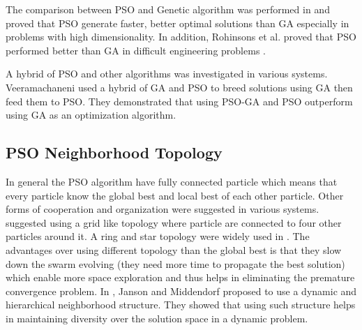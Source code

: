  The comparison between PSO and Genetic algorithm was performed in \cite{PSOGAComp,ComparePSOGA05,CoPSAanGA05,PAOvsGA07} and proved that PSO generate faster, better optimal solutions than GA especially in problems with high dimensionality. In addition, Rohinsons et al. \cite{RohinsonPSGA} proved that PSO performed better than GA in difficult engineering problems \cite{EngineerProblemGA}. 
 
 
 
 A hybrid of PSO and other algorithms was investigated in various systems. Veeramachaneni \cite{kaylanGAPSO} used a hybrid of GA and PSO to breed solutions using GA then feed them to PSO. They demonstrated that using PSO-GA and PSO outperform using GA as an optimization algorithm. 
 
 
 
 
 
 
 
\subsection{PSO Neighborhood Topology}  
In general the PSO algorithm have fully connected particle which means that every particle know the global best and local best of each other particle. Other forms of cooperation and organization were suggested in various systems.  \cite{grid} suggested using a grid like topology where particle are connected to four other particles around it. A ring and star topology were widely used in \cite{neighbourrhood}. The advantages over using different topology than the global best is that they slow down the swarm evolving (they need more time to propagate the best solution) which enable more space exploration and thus helps in eliminating the premature convergence problem. In \cite{hiericalPSO}, Janson and Middendorf proposed to use a dynamic and hierarchical neighborhood structure. They showed that using such structure helps in maintaining diversity over the solution space in a dynamic problem. %

